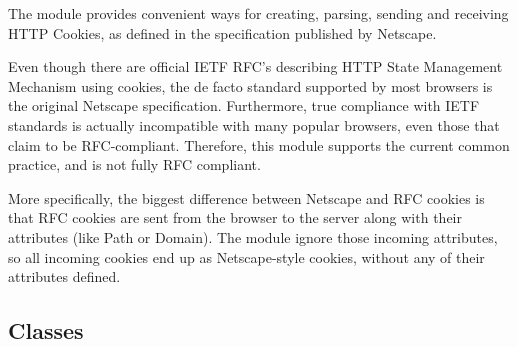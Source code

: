 The  module provides convenient ways for creating,
parsing, sending and receiving HTTP Cookies, as defined in the
specification published by Netscape.

\begin{notice}
  Even though there are official IETF RFC's describing HTTP State
  Management Mechanism using cookies, the de facto standard supported
  by most browsers is the original Netscape specification.
  Furthermore, true compliance with IETF standards is actually
  incompatible with many popular browsers, even those that claim to be
  RFC-compliant. Therefore, this module supports the current common
  practice, and is not fully RFC compliant.
  
  More specifically, the biggest difference between Netscape and RFC cookies is 
  that RFC cookies are sent from the browser to the server along with their 
  attributes (like Path or Domain). The  module ignore those 
  incoming attributes, so all incoming cookies end up as Netscape-style cookies, 
  without any of their attributes defined.
\end{notice}

\begin{seealso}
\end{seealso}

\subsection{Classes\label{pyapi-cookie-classes}}

